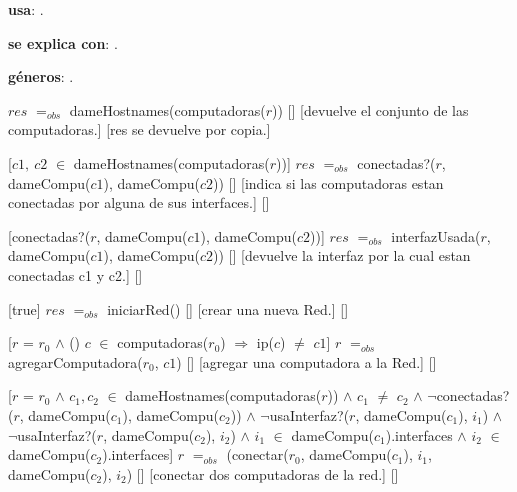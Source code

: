 \begin{Interfaz}

  \textbf{usa}: .
  
  \textbf{se explica con}: .

  \textbf{g\'eneros}: .


  {$res$ $=_{obs}$ dameHostnames(computadoras($r$))}%
  []
  [devuelve el conjunto de las computadoras.]
  [res se devuelve por copia.]

  [$c1,\ c2$ $\in$ dameHostnames(computadoras($r$))]
  {$res$ $=_{obs}$ conectadas?($r$, dameCompu($c1$), dameCompu($c2$))}
  []
  [indica si las computadoras estan conectadas por alguna de sus interfaces.]
  []

  [conectadas?($r$, dameCompu($c1$), dameCompu($c2$))]
  {$res$ $=_{obs}$ interfazUsada($r$, dameCompu($c1$), dameCompu($c2$))}
  []
  [devuelve la interfaz por la cual estan conectadas c1 y c2.]
  []

  [true]
  {$res$ $=_{obs}$ iniciarRed()}
  []
  [crear una nueva Red.]
  []
  
  [$r$ = $r_0$ $\wedge$
  () $c$ $\in$ computadoras($r_0$) $\Rightarrow$ ip($c$) $\neq$ $c1$]
  {$r$ $=_{obs}$ agregarComputadora($r_0$, $c1$)}
  []
  [agregar una computadora a la Red.]
  []

  [$r$ = $r_0$ $\wedge$ $c_1, c_2$ $\in$ dameHostnames(computadoras($r$)) $\wedge$ $c_1$ $\neq$ $c_2$	$\wedge$ \newline $\neg$conectadas?($r$, dameCompu($c_1$), dameCompu($c_2$)) $\wedge$ $\neg$usaInterfaz?($r$, dameCompu($c_1$), $i_1$) $\wedge$ $\neg$usaInterfaz?($r$, dameCompu($c_2$), $i_2$) $\wedge$ $i_1$ $\in$ dameCompu($c_1$).interfaces $\wedge$ $i_2$ $\in$ dameCompu($c_2$).interfaces]
  {$r$ $=_{obs}$ (conectar($r_0$, dameCompu($c_1$), $i_1$, dameCompu($c_2$), $i_2$)}
  []
  [conectar dos computadoras de la red.]
  []
   

\end{Interfaz}
